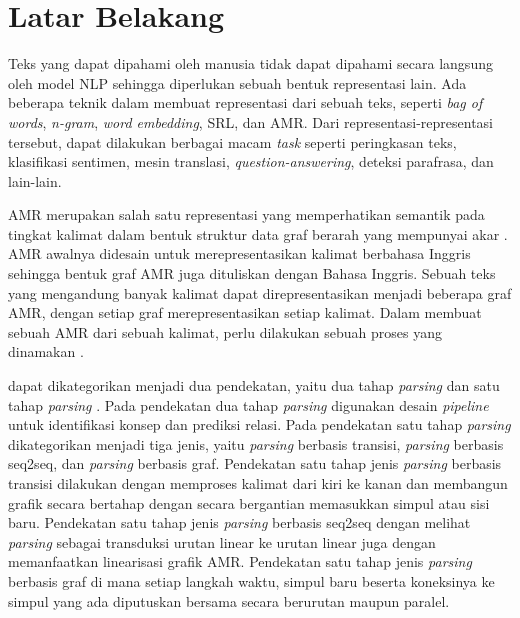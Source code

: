 \section{Latar Belakang}

Teks yang dapat dipahami oleh manusia tidak dapat dipahami secara langsung oleh model \gls{NLP} sehingga diperlukan sebuah bentuk representasi lain.
Ada beberapa teknik dalam membuat representasi dari sebuah teks, seperti \textit{bag of words}, \textit{n-gram}, \textit{word embedding}, \gls{SRL}, dan \gls{AMR}.
Dari representasi-representasi tersebut, dapat dilakukan berbagai macam \textit{task} seperti peringkasan teks, klasifikasi sentimen, mesin translasi, \textit{question-answering}, deteksi parafrasa, dan lain-lain.

\gls{AMR} merupakan salah satu representasi yang memperhatikan semantik pada tingkat kalimat dalam bentuk struktur data graf berarah yang mempunyai akar .
\gls{AMR} awalnya didesain untuk merepresentasikan kalimat berbahasa Inggris sehingga bentuk graf \gls{AMR} juga dituliskan dengan Bahasa Inggris.
Sebuah teks yang mengandung banyak kalimat dapat direpresentasikan menjadi beberapa graf \gls{AMR}, dengan setiap graf merepresentasikan setiap kalimat.
Dalam membuat sebuah \gls{AMR} dari sebuah kalimat, perlu dilakukan sebuah proses yang dinamakan \amrparsing.

\amrparsing{} dapat dikategorikan menjadi dua pendekatan, yaitu dua tahap \textit{parsing} dan satu tahap \textit{parsing} .
Pada pendekatan dua tahap \textit{parsing} digunakan desain \textit{pipeline} untuk identifikasi konsep dan prediksi relasi.
Pada pendekatan satu tahap \textit{parsing} dikategorikan menjadi tiga jenis, yaitu \textit{parsing} berbasis transisi, \textit{parsing} berbasis \gls{seq2seq}, dan \textit{parsing} berbasis graf.
Pendekatan satu tahap jenis \textit{parsing} berbasis transisi dilakukan dengan memproses kalimat dari kiri ke kanan dan membangun grafik secara bertahap dengan secara bergantian memasukkan simpul atau sisi baru.
Pendekatan satu tahap jenis \textit{parsing} berbasis \gls{seq2seq} dengan melihat \textit{parsing} sebagai transduksi urutan linear ke urutan linear juga dengan memanfaatkan linearisasi grafik AMR.
Pendekatan satu tahap jenis \textit{parsing} berbasis graf di mana setiap langkah waktu, simpul baru beserta koneksinya ke simpul yang ada diputuskan bersama secara berurutan maupun paralel.

